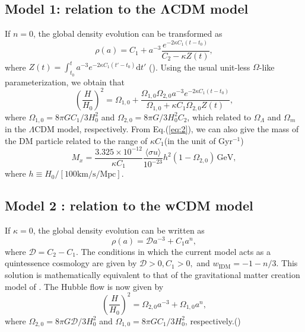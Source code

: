 \documentclass[twocolumn]{aastex631}
\begin{document}
\subsection{Model 1: relation to the ΛCDM model}

   If $n=0$, the global density evolution can be transformed as
   \begin{equation}
      \rho(a)=C_1+a^{-3}\frac{e^{-2\kappa C_1(t-t_0)}}{C_2-\kappa Z(t)},
   \end{equation}
   where $Z(t)=\int_{t_0}^ta^{-3}e^{-2\kappa C_1(t'-t_0)}\mathrm{d}t'$ (\cite{Basilakos_2009}).
   Using the usual unit-less $\Omega$-like parameterization, we obtain that
   \begin{equation}
      \left(\frac{H}{H_0}\right)^2=\Omega_{1,0}+\frac{\Omega_{1,0}\Omega_{2,0}a^{-3}e^{-2\kappa C_1(t-t_0)}}
      {\Omega_{1,0}+\kappa C_1\Omega_{2,0}Z(t)},\label{eq:8}
   \end{equation}
   where $\Omega_{1,0}=8\pi GC_1/3H_0^2$ and $\Omega_{2,0}=8\pi G/3H_0^2C_2$,
   which related to $\Omega_{\Lambda}$ and $\Omega_m$ in the $\Lambda$CDM model,
   respectively.
   From Eq.({\ref{eq:2}}), we can also give the mass of the DM particle
   related to the range of $\kappa C_1$(in the unit of Gyr${}^{-1}$)
   \begin{equation}
      M_x=\frac{3.325\times10^{-12}}{\kappa C_1}
      \frac{\langle\sigma u\rangle}{10^{-23}}h^2(1-\Omega_{2,0})\,\text{GeV},\label{eq:9}
   \end{equation}
   where $h\equiv H_0/[100\text{km/s/Mpc}]$.

\subsection{Model 2 : relation to the wCDM model}

   If $\kappa=0$, the global density evolution can be written as
   \begin{equation}
      \rho(a)=\mathcal{D}a^{-3}+C_1a^{n},
   \end{equation}
   where $\mathcal{D}=C_2-C_1$. The conditions in which the current 
   model acts as a quintessence cosmology are given by $\mathcal{D}>0,
   C_1>0,$ and $w_{\text{IDM}}=-1-n/3$. This solution is mathematically
   equivalent to that of the gravitational matter creation model of \cite{Lima_2008}.
   The Hubble flow is now given by
   \begin{equation}
      \left(\frac{H}{H_0}\right)^2=\Omega_{2,0}a^{-3}+\Omega_{1,0}a^{n},
   \end{equation}
   where $\Omega_{2,0}=8\pi G\mathcal{D}/3H_0^2$ and 
   $\Omega_{1,0}=8\pi GC_1/3H_0^2$, respectively.(\cite{Basilakos_2009})
   
\end{document}
